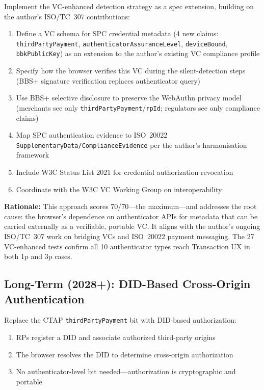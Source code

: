 \documentclass[12pt,a4paper]{article}
\begin{document}
Implement the VC-enhanced detection strategy as a spec extension, building on the author's ISO/TC~307 contributions:

\begin{enumerate}[noitemsep,topsep=4pt]
  \item Define a VC schema for SPC credential metadata (4 new claims: \texttt{thirdPartyPayment}, \texttt{authenticatorAssuranceLevel}, \texttt{deviceBound}, \texttt{bbkPublicKey}) as an extension to the author's existing VC compliance profile
  \item Specify how the browser verifies this VC during the silent-detection steps (BBS+ signature verification replaces authenticator query)
  \item Use BBS+ selective disclosure to preserve the WebAuthn privacy model (merchants see only \texttt{thirdPartyPayment}/\texttt{rpId}; regulators see only compliance claims)
  \item Map SPC authentication evidence to ISO~20022 \texttt{SupplementaryData/ComplianceEvidence} per the author's harmonisation framework
  \item Include W3C Status List 2021 for credential authorization revocation
  \item Coordinate with the W3C VC Working Group on interoperability
\end{enumerate}

\noindent\textbf{Rationale:} This approach scores 70/70---the maximum---and addresses the root cause: the browser's dependence on authenticator APIs for metadata that can be carried externally as a verifiable, portable VC. It aligns with the author's ongoing ISO/TC~307 work on bridging VCs and ISO~20022 payment messaging. The 27 VC-enhanced tests confirm all 10 authenticator types reach Transaction UX in both 1p and 3p cases.

\subsection{Long-Term (2028+): DID-Based Cross-Origin Authentication}

Replace the CTAP \texttt{thirdPartyPayment} bit with DID-based authorization:

\begin{enumerate}[noitemsep,topsep=4pt]
  \item RPs register a DID and associate authorized third-party origins
  \item The browser resolves the DID to determine cross-origin authorization
  \item No authenticator-level bit needed---authorization is cryptographic and portable
\end{enumerate}
\end{document}
